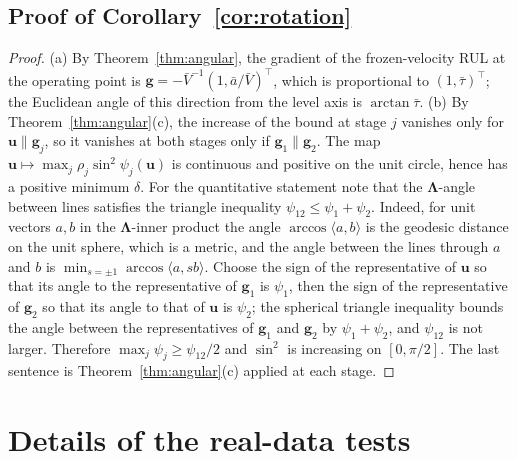 \documentclass[preprint,12pt]{elsarticle}
\theoremstyle{definition}
\begin{document}
\subsection{Proof of Corollary~\ref{cor:rotation}}
\begin{proof}
(a) By Theorem~\ref{thm:angular}, the gradient of the frozen-velocity RUL at the operating point is $\mathbf g=-\bar V^{-1}(1,\bar a/\bar V)^\top$, which is proportional to $(1,\bar\tau)^\top$; the Euclidean angle of this direction from the level axis is $\arctan\bar\tau$. (b) By Theorem~\ref{thm:angular}(c), the increase of the bound at stage $j$ vanishes only for $\mathbf u\parallel\mathbf g_j$, so it vanishes at both stages only if $\mathbf g_1\parallel\mathbf g_2$. The map $\mathbf u\mapsto\max_j\rho_j\sin^2\psi_j(\mathbf u)$ is continuous and positive on the unit circle, hence has a positive minimum $\delta$. For the quantitative statement note that the $\boldsymbol\Lambda$-angle between lines satisfies the triangle inequality $\psi_{12}\le\psi_1+\psi_2$. Indeed, for unit vectors $a,b$ in the $\boldsymbol\Lambda$-inner product the angle $\arccos\langle a,b\rangle$ is the geodesic distance on the unit sphere, which is a metric, and the angle between the lines through $a$ and $b$ is $\min_{s=\pm1}\arccos\langle a,sb\rangle$. Choose the sign of the representative of $\mathbf u$ so that its angle to the representative of $\mathbf g_1$ is $\psi_1$, then the sign of the representative of $\mathbf g_2$ so that its angle to that of $\mathbf u$ is $\psi_2$; the spherical triangle inequality bounds the angle between the representatives of $\mathbf g_1$ and $\mathbf g_2$ by $\psi_1+\psi_2$, and $\psi_{12}$ is not larger. Therefore $\max_j\psi_j\ge\psi_{12}/2$ and $\sin^2$ is increasing on $[0,\pi/2]$. The last sentence is Theorem~\ref{thm:angular}(c) applied at each stage.
\end{proof}

\section{Details of the real-data tests}
\label{app:realdata}
\end{document}
